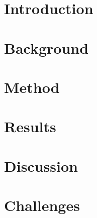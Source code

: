 \documentclass[a4paper, 12pt, openany]{book} %
\begin{document}

\pagestyle{fancy} %
\fancyhf{} %
\renewcommand{\headrulewidth}{0pt} %
\fancyhead[LE, RO]{\thepage} %
\fancyhead[RE, LO]{\leftmark} %
\setlength{\headheight}{14.49998pt} %



\chapter{Introduction}

\cleardoublepage


\chapter{Background}

\cleardoublepage


\chapter{Method}

\cleardoublepage


\chapter{Results}

\cleardoublepage


\chapter{Discussion}

\cleardoublepage

\chapter{Challenges}

\cleardoublepage
\end{document}
